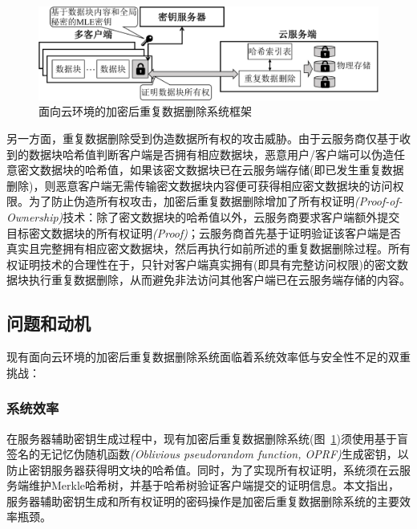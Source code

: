 \begin{figure}[!htb]
    \small
    \centering
    \includegraphics[width=\textwidth]{pic/background/Cloud-encrypted-deduplication-logic.pdf}
    \caption{面向云环境的加密后重复数据删除系统框架}
    \label{fig:Cloud-based-encrypted-deduplication-storage-logic}
\end{figure}

另一方面，重复数据删除受到伪造数据所有权的攻击威胁\cite{harnik2010side,mulazzani11}。由于云服务商仅基于收到的数据块哈希值判断客户端是否拥有相应数据块，恶意用户/客户端可以伪造任意密文数据块的哈希值，如果该密文数据块已在云服务端存储(即已发生重复数据删除)，则恶意客户端无需传输密文数据块内容便可获得相应密文数据块的访问权限。为了防止伪造所有权攻击，加密后重复数据删除增加了所有权证明\textit{(Proof-of-Ownership)}技术\cite{halevi11}：除了密文数据块的哈希值以外，云服务商要求客户端额外提交目标密文数据块的所有权证明\textit{(Proof)}；云服务商首先基于证明验证该客户端是否真实且完整拥有相应密文数据块，然后再执行如前所述的重复数据删除过程。所有权证明技术的合理性在于，只针对客户端真实拥有(即具有完整访问权限)的密文数据块执行重复数据删除，从而避免非法访问其他客户端已在云服务端存储的内容。

\subsection{问题和动机}
\label{subsec:intro-problem}

现有面向云环境的加密后重复数据删除系统面临着系统效率低与安全性不足的双重挑战：

\subsubsection{系统效率}
\label{subsubsec:intro-problem-performance}

在服务器辅助密钥生成过程中，现有加密后重复数据删除系统(图~\ref{fig:Cloud-based-encrypted-deduplication-storage-logic})须使用基于盲签名\cite{armknecht2015transparent,bellare2013DupLESS}的无记忆伪随机函数\textit{(Oblivious pseudorandom function, OPRF)}生成密钥\cite{bellare2013DupLESS}，以防止密钥服务器获得明文块的哈希值。同时，为了实现所有权证明，系统须在云服务端维护Merkle哈希树，并基于哈希树验证客户端提交的证明信息\cite{halevi2011proofs}。本文指出，服务器辅助密钥生成和所有权证明的密码操作是加密后重复数据删除系统的主要效率瓶颈。

